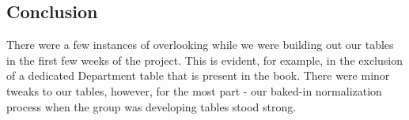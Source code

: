 \documentclass[12pt]{article}
\begin{document}
\subsection*{Conclusion}
There were a few instances of overlooking while we were building out our tables in the first few weeks of the project. This is evident, for example, in the exclusion of a dedicated Department table that is present in the book. There were minor tweaks to our tables, however, for the most part - our baked-in normalization process when the group was developing tables stood strong. 
\end{document}

